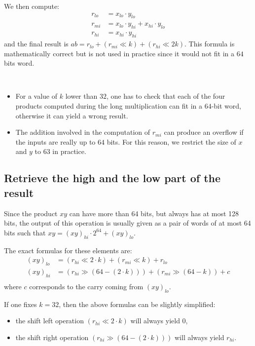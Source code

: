 \documentclass[a4paper]{article}
\begin{document}
\bigskip
We then compute:
\begin{align*}
    r_{lo} &= x_{lo}\cdot y_{lo} \\
    r_{mi} &= x_{lo}\cdot y_{hi} + x_{hi}\cdot y_{lo} \\
    r_{hi} &= x_{hi}\cdot y_{hi}
\end{align*}
and the final result is $ab = r_{lo} + (r_{mi} \ll k) + (r_{hi} \ll 2k)$. 
This formula is mathematically correct but is not used in practice since it would not fit in a $64$ bits word. 

\begin{remark}
    \
    \begin{itemize}
        \item For a value of $k$ lower than $32$, one has to check that each of the four products computed during the long multiplication can fit in a
        $64$-bit word, otherwise it can yield a wrong result.
        \item The addition involved in the computation of $r_{mi}$ can produce an overflow if the inputs are really up to $64$ bits.
        For this reason, we restrict the size of $x$ and $y$ to $63$ in practice. 
    \end{itemize}
\end{remark}

\subsection{Retrieve the high and the low part of the result}

Since the product $xy$ can have more than 64 bits, but always has at most 128 bits, the output of this operation is usually given as a pair of words of at most 64 
bits such that $xy = (xy)_{hi}\cdot 2^{64} + (xy)_{lo}$.

\bigskip
The exact formulas for these elements are:
\begin{align*}
    (xy)_{lo} &= (r_{hi} \ll 2\cdot k) + (r_{mi} \ll k) + r_{lo} \\
    (xy)_{hi} &= (r_{hi} \gg (64 - (2\cdot k))) + (r_{mi} \gg (64 - k)) + c \\
\end{align*}
where $c$ corresponds to the carry coming from $(xy)_{lo}$.

\begin{remark}
    If one fixes $k=32$, then the above formulas can be slightly simplified:
    \begin{itemize}
        \item the shift left operation $(r_{hi} \ll 2\cdot k)$ will always yield 0,
        \item the shift right operation $(r_{hi} \gg (64 - (2\cdot k)))$ will always yield $r_{hi}$.
    \end{itemize}
\end{remark}
\end{document}
